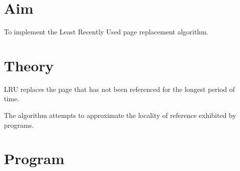 \documentclass[12pt,a4paper]{report}
\begin{document}
\section*{Aim}

To implement the Least Recently Used page replacement algorithm.

\section*{Theory}

LRU replaces the page that has not been referenced for the longest period of
time.

The algorithm attempts to approximate the locality of reference exhibited by
programs.

\section*{Program}
\end{document}
